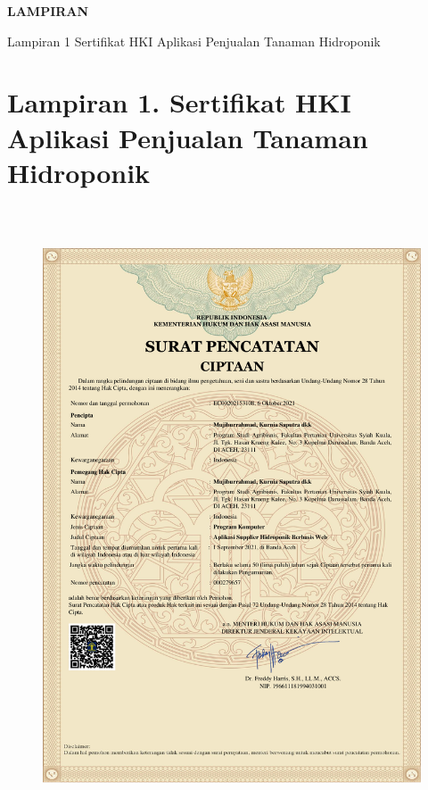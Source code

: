 
\begin{center}
    \large{\textbf{LAMPIRAN}}
\end{center}

\begin{appendices}{Lampiran 1 Sertifikat HKI Aplikasi Penjualan Tanaman Hidroponik}
    \section*{Lampiran 1. Sertifikat HKI Aplikasi Penjualan Tanaman Hidroponik}
    \label{lampiran 1}
    \begin{figure}[H]
        \includegraphics[width=13.3cm,height=18.3cm]{gambar/HKI.pdf}
    \end{figure}
\end{appendices}

\newpage


